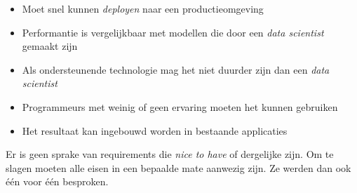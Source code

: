 \begin{itemize}
    \item Moet snel kunnen \textit{deployen} naar een productieomgeving
    \item Performantie is vergelijkbaar met modellen die door een \textit{data scientist} gemaakt zijn
    \item Als ondersteunende technologie mag het niet duurder zijn dan een \textit{data scientist}
    \item Programmeurs met weinig of geen ervaring moeten het kunnen gebruiken
    \item Het resultaat kan ingebouwd worden in bestaande applicaties
\end{itemize}

Er is geen sprake van requirements die \textit{nice to have} of dergelijke zijn. Om te slagen moeten alle eisen in een bepaalde mate aanwezig zijn. Ze werden dan ook één voor één besproken.